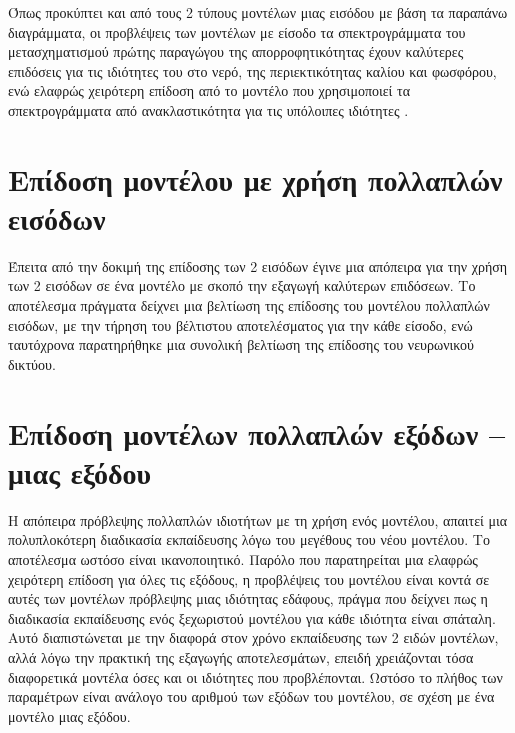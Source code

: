 Όπως προκύπτει και από τους 2 τύπους μοντέλων μιας εισόδου με βάση τα παραπάνω διαγράμματα, οι προβλέψεις των μοντέλων με είσοδο τα σπεκτρογράμματα του μετασχηματισμού  πρώτης παραγώγου της απορροφητικότητας έχουν καλύτερες επιδόσεις για τις ιδιότητες του  στο νερό, της περιεκτικότητας καλίου και φωσφόρου, ενώ ελαφρώς χειρότερη επίδοση από το μοντέλο που χρησιμοποιεί τα σπεκτρογράμματα από ανακλαστικότητα για τις υπόλοιπες ιδιότητες .

\section{Επίδοση μοντέλου με χρήση πολλαπλών εισόδων}
Έπειτα από την δοκιμή της επίδοσης των 2 εισόδων έγινε μια απόπειρα για την χρήση των 2 εισόδων σε ένα μοντέλο με σκοπό την εξαγωγή καλύτερων επιδόσεων. Το αποτέλεσμα πράγματα δείχνει μια βελτίωση της επίδοσης του μοντέλου πολλαπλών εισόδων, με την τήρηση του βέλτιστου αποτελέσματος για την κάθε είσοδο, ενώ ταυτόχρονα παρατηρήθηκε μια συνολική βελτίωση της επίδοσης του νευρωνικού δικτύου.

\section{Επίδοση μοντέλων πολλαπλών εξόδων -- μιας εξόδου}
Η απόπειρα πρόβλεψης πολλαπλών ιδιοτήτων με τη χρήση ενός μοντέλου, απαιτεί μια πολυπλοκότερη διαδικασία εκπαίδευσης λόγω του μεγέθους του νέου μοντέλου. Το αποτέλεσμα ωστόσο είναι ικανοποιητικό. Παρόλο που παρατηρείται μια ελαφρώς χειρότερη επίδοση για όλες τις εξόδους, η προβλέψεις του μοντέλου είναι κοντά σε αυτές των μοντέλων πρόβλεψης μιας ιδιότητας εδάφους, πράγμα που δείχνει πως η διαδικασία εκπαίδευσης ενός ξεχωριστού μοντέλου για κάθε ιδιότητα είναι σπάταλη. Αυτό διαπιστώνεται με την διαφορά στον χρόνο εκπαίδευσης των 2 ειδών μοντέλων, αλλά λόγω την πρακτική της εξαγωγής αποτελεσμάτων, επειδή χρειάζονται τόσα διαφορετικά μοντέλα όσες και οι ιδιότητες που προβλέπονται. Ωστόσο το πλήθος των παραμέτρων είναι ανάλογο του αριθμού των εξόδων του μοντέλου, σε σχέση με ένα μοντέλο μιας εξόδου.

